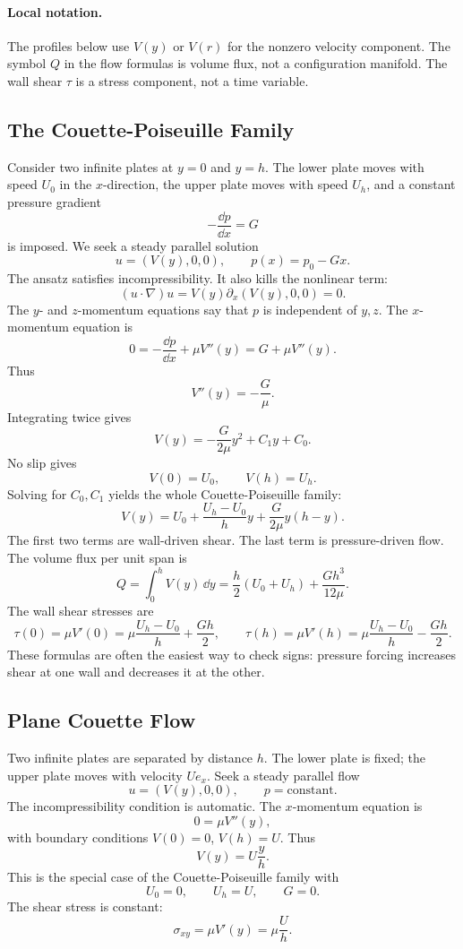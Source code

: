 \paragraph{Local notation.}
The profiles below use \(V(y)\) or \(V(r)\) for the nonzero velocity component.
The symbol \(Q\) in the flow formulas is volume flux, not a configuration
manifold.  The wall shear \(\tau\) is a stress component, not a time variable.

\subsection{The Couette-Poiseuille Family}
\label{subsec:couette-poiseuille-family}

Consider two infinite plates at \(y=0\) and \(y=h\). The lower plate moves with
speed \(U_0\) in the \(x\)-direction, the upper plate moves with speed \(U_h\),
and a constant pressure gradient
\[
  -\frac{\dd p}{\dd x}=G
\]
is imposed. We seek a steady parallel solution
\[
  u=(V(y),0,0),
  \qquad
  p(x)=p_0-Gx.
\]
The ansatz satisfies incompressibility. It also kills the nonlinear term:
\[
  (u\cdot\nabla)u=V(y)\partial_x(V(y),0,0)=0.
\]
The \(y\)- and \(z\)-momentum equations say that \(p\) is independent of
\(y,z\). The \(x\)-momentum equation is
\[
  0=-\frac{\dd p}{\dd x}+\mu V''(y)
  =
  G+\mu V''(y).
\]
Thus
\[
  V''(y)=-\frac{G}{\mu}.
\]
Integrating twice gives
\[
  V(y)=-\frac{G}{2\mu}y^2+C_1y+C_0.
\]
No slip gives
\[
  V(0)=U_0,\qquad V(h)=U_h.
\]
Solving for \(C_0,C_1\) yields the whole Couette-Poiseuille family:
\[
  \boxed{
  V(y)
  =
  U_0+\frac{U_h-U_0}{h}y
  +
  \frac{G}{2\mu}y(h-y).
  }
\]
The first two terms are wall-driven shear. The last term is pressure-driven
flow. The volume flux per unit span is
\[
  Q
  =
  \int_0^h V(y)\,\dd y
  =
  \frac{h}{2}(U_0+U_h)+\frac{Gh^3}{12\mu}.
  \]
The wall shear stresses are
\[
  \tau(0)=\mu V'(0)
  =
  \mu\frac{U_h-U_0}{h}+\frac{Gh}{2},
  \qquad
  \tau(h)=\mu V'(h)
  =
  \mu\frac{U_h-U_0}{h}-\frac{Gh}{2}.
\]
These formulas are often the easiest way to check signs: pressure forcing
increases shear at one wall and decreases it at the other.

\subsection{Plane Couette Flow}
\label{subsec:plane-couette}

Two infinite plates are separated by distance \(h\). The lower plate is fixed;
the upper plate moves with velocity \(Ue_x\). Seek a steady parallel flow
\[
  u=(V(y),0,0),\qquad p=\text{constant}.
\]
The incompressibility condition is automatic. The \(x\)-momentum equation is
\[
  0=\mu V''(y),
\]
with boundary conditions \(V(0)=0\), \(V(h)=U\). Thus
\[
  \boxed{V(y)=U\frac{y}{h}.}
\]
This is the special case of the Couette-Poiseuille family with
\[
  U_0=0,\qquad U_h=U,\qquad G=0.
\]
The shear stress is constant:
\[
  \sigma_{xy}=\mu V'(y)=\mu\frac{U}{h}.
\]

